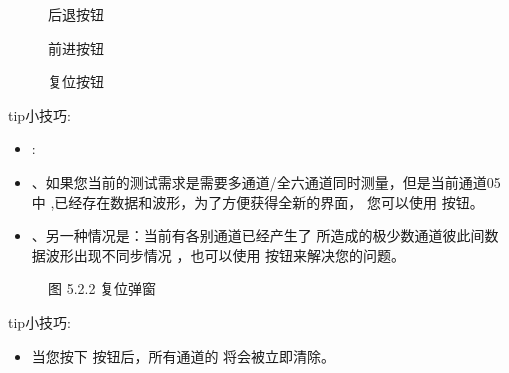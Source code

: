 \documentclass[a4paper,10pt,english]{sphinxmanual}
\begin{document}
\begin{wrapfigure}{l}{0pt}
\centering
\noindent{}
\caption{后退按钮}\label{\detokenize{operation_guide:id7}}\end{wrapfigure}


\begin{wrapfigure}{r}{0pt}
\centering
\noindent{}
\caption{前进按钮}\label{\detokenize{operation_guide:id8}}\end{wrapfigure}

\begin{figure}[htbp]
\centering
\capstart

\noindent{}
\caption{复位按钮}\label{\detokenize{operation_guide:id9}}\end{figure}

\begin{sphinxadmonition}{tip}{小技巧:}\begin{itemize}
\item {} 
\sphinxAtStartPar
{} :

\item {} 
、如果您当前的测试需求是需要多通道/全六通道同时测量，但是当前通道0\sphinxhyphen{}5中  ,已经存在数据和波形，为了方便获得全新的界面，
您可以使用  按钮。

\item {} 
、另一种情况是：当前有各别通道已经产生了  所造成的极少数通道彼此间数据波形出现不同步情况 ，也可以使用  按钮来解决您的问题。

\end{itemize}
\end{sphinxadmonition}

\begin{figure}[htbp]
\centering
\capstart

\noindent{}
\caption{图 5.2.2 复位弹窗}\label{\detokenize{operation_guide:id10}}\end{figure}

\begin{sphinxadmonition}{tip}{小技巧:}\begin{itemize}
\item {} 
\sphinxAtStartPar
当您按下  按钮后，所有通道的  将会被立即清除。

\end{itemize}
\end{sphinxadmonition}
\end{document}
